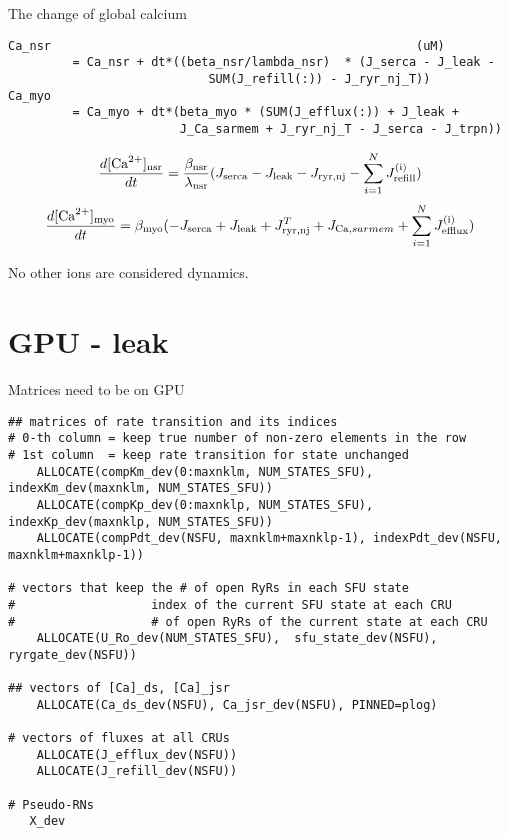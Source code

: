 The change of global calcium 
\begin{verbatim}
Ca_nsr                                                   (uM)
         = Ca_nsr + dt*((beta_nsr/lambda_nsr)  * (J_serca - J_leak -
                            SUM(J_refill(:)) - J_ryr_nj_T)) 
Ca_myo
         = Ca_myo + dt*(beta_myo * (SUM(J_efflux(:)) + J_leak +
                        J_Ca_sarmem + J_ryr_nj_T - J_serca - J_trpn))   
\end{verbatim}
\begin{equation}
  \label{eq:22}
  \begin{split}
    \frac{d[{\text{Ca}^{2+}}]_{\text{nsr}}}{dt} = \frac{\beta_{\text{nsr}}}{\lambda_{\text{nsr}}} (J_{\text{serca}}
    - J_{\text{leak}} - J_{\text{ryr,nj}} - \sum^N_{i=1}
    J_{\text{refill}}^{\text{(i)}})
  \end{split}
\end{equation}
\begin{equation}
  \label{eq:36}
  \frac{d[{\text{Ca}^{2+}}]_{\text{myo}}}{dt} = \beta_{\text{myo}} (-J_{\text{serca}} + J_{\text{leak}} +
  J_{\text{ryr},{\text{nj}}}^T + J_{{\text{Ca}},sarmem} + \sum^N_{i=1} J_{\text{efflux}}^{\text{(i)}})
\end{equation}

No other ions are considered dynamics.

\section{GPU - leak}
\label{sec:gpu-leak}

Matrices need to be on GPU
\begin{verbatim}
## matrices of rate transition and its indices
# 0-th column = keep true number of non-zero elements in the row
# 1st column  = keep rate transition for state unchanged
    ALLOCATE(compKm_dev(0:maxnklm, NUM_STATES_SFU), indexKm_dev(maxnklm, NUM_STATES_SFU))
    ALLOCATE(compKp_dev(0:maxnklp, NUM_STATES_SFU), indexKp_dev(maxnklp, NUM_STATES_SFU))
    ALLOCATE(compPdt_dev(NSFU, maxnklm+maxnklp-1), indexPdt_dev(NSFU,
maxnklm+maxnklp-1))

# vectors that keep the # of open RyRs in each SFU state
#                   index of the current SFU state at each CRU
#                   # of open RyRs of the current state at each CRU
    ALLOCATE(U_Ro_dev(NUM_STATES_SFU),  sfu_state_dev(NSFU), ryrgate_dev(NSFU))

## vectors of [Ca]_ds, [Ca]_jsr
    ALLOCATE(Ca_ds_dev(NSFU), Ca_jsr_dev(NSFU), PINNED=plog)

# vectors of fluxes at all CRUs
    ALLOCATE(J_efflux_dev(NSFU))
    ALLOCATE(J_refill_dev(NSFU))

# Pseudo-RNs
   X_dev

\end{verbatim}






